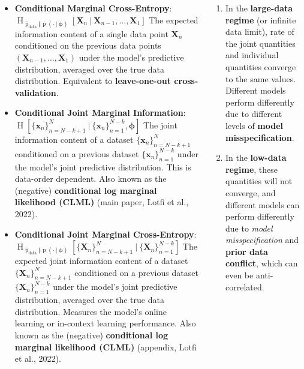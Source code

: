 \documentclass[25pt,a0paper,landscape]{tikzposter}
\newcommand{\MidSymbol}[1][]{\:#1\:}
\newcommand{\given}{\MidSymbol[\vert]}
\DeclareMathOperator{\opEntropy}{H}
\newcommand{\Hof}[1]{\opEntropy[#1]}
\newcommand{\iCrossEntropy}[3]{\opEntropy_{#1 \Vert #2}[#3]}
\DeclareMathOperator{\opp}{p}
\newcommand{\pof}[1]{\opp(#1)}
\newcommand{\h}{\boldsymbol{\phi}}
\newcommand{\XNsetk}{\{\X_n\}_{n=N-k+1}^N}
\newcommand{\xNsetk}{\{\x_n\}_{n=N-k+1}^N}
\newcommand{\XNkset}{\{\X_n\}_{n=1}^{N-k}}
\newcommand{\xNkset}{\{\x_n\}_{n=1}^{N-k}}
\newcommand{\x}{\boldsymbol{x}}
\newcommand{\X}{\boldsymbol{X}}
\newcommand{\oppdata}{\hat{\opp}_{\text{data}}}
\begin{document}
\begin{columns}
{\begin{theorybox}[title=Information Quantities]
\begin{itemize}
        \item \textbf{Conditional Marginal Cross-Entropy}: $\iCrossEntropy{\oppdata}{\pof{\cdot \given \h}}{\X_n \given \X_{n-1}, \ldots, \X_1}$
        The expected information content of a single data point $\X_n$ conditioned on the previous data points $(\X_{n-1}, \ldots, \X_1)$ under the model's predictive distribution, averaged over the true data distribution. Equivalent to \textbf{leave-one-out cross-validation}.
        \item \textbf{Conditional Joint Marginal Information}: $\Hof{\xNsetk \given \xNkset, \h}$
        The joint information content of a dataset $\xNsetk$ conditioned on a previous dataset $\xNkset$ under the model's joint predictive distribution. This is data-order dependent. Also known as the (negative) \textbf{conditional log marginal likelihood (CLML)} (main paper, Lotfi et al., 2022)\cite{lotfi2022bayesian}.
        \item \textbf{Conditional Joint Marginal Cross-Entropy}: $\iCrossEntropy{\oppdata}{\pof{\cdot \given \h}}{\XNsetk \given \XNkset}$
        The expected joint information content of a dataset $\XNsetk$ conditioned on a previous dataset $\XNkset$ under the model's joint predictive distribution, averaged over the true data distribution. Measures the model's online learning or in-context learning performance. Also known as the (negative) \textbf{conditional log marginal likelihood (CLML)} (appendix, Lotfi et al., 2022)\cite{lotfi2022bayesian}.
      \end{itemize}
    \end{theorybox}
    \begin{tldrbox}
      \begin{enumerate}
        \item In the \textbf{large-data regime} (or infinite data limit), rate of the joint quantities and individual quantities converge to the same values.
      Different models perform differently due to different levels of \textbf{model misspecification}.
        \item In the \textbf{low-data regime}, these quantities will not converge, and different models can perform differently due to \emph{model misspecification} and \textbf{prior data conflict}, which can even be anti-correlated.
      \end{enumerate}
    \end{tldrbox}
}
\end{columns}
\end{document}
